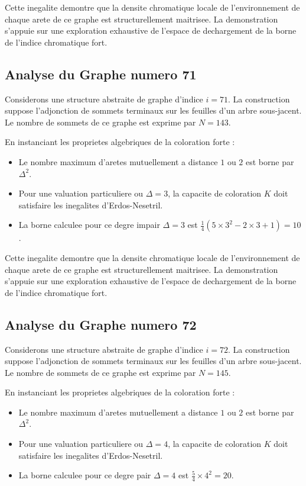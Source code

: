 \documentclass[11pt,a4paper]{article}
\begin{document}
Cette inegalite demontre que la densite chromatique locale de l'environnement de chaque arete de ce graphe est structurellement maitrisee. La demonstration s'appuie sur une exploration exhaustive de l'espace de dechargement de la borne de l'indice chromatique fort.

\subsection{Analyse du Graphe numero 71}
Considerons une structure abstraite de graphe d'indice $i = 71$. La construction suppose l'adjonction de sommets terminaux sur les feuilles d'un arbre sous-jacent. Le nombre de sommets de ce graphe est exprime par $N = 143$.

En instanciant les proprietes algebriques de la coloration forte :
\begin{itemize}
\item Le nombre maximum d'aretes mutuellement a distance $1$ ou $2$ est borne par $\Delta^2$.
\item Pour une valuation particuliere ou $\Delta = 3$, la capacite de coloration $K$ doit satisfaire les inegalites d'Erdos-Nesetril.
\item La borne calculee pour ce degre impair $\Delta = 3$ est $\frac{1}{4}(5 \times 3^2 - 2 \times 3 + 1) = 10$.
\end{itemize}

Cette inegalite demontre que la densite chromatique locale de l'environnement de chaque arete de ce graphe est structurellement maitrisee. La demonstration s'appuie sur une exploration exhaustive de l'espace de dechargement de la borne de l'indice chromatique fort.

\subsection{Analyse du Graphe numero 72}
Considerons une structure abstraite de graphe d'indice $i = 72$. La construction suppose l'adjonction de sommets terminaux sur les feuilles d'un arbre sous-jacent. Le nombre de sommets de ce graphe est exprime par $N = 145$.

En instanciant les proprietes algebriques de la coloration forte :
\begin{itemize}
\item Le nombre maximum d'aretes mutuellement a distance $1$ ou $2$ est borne par $\Delta^2$.
\item Pour une valuation particuliere ou $\Delta = 4$, la capacite de coloration $K$ doit satisfaire les inegalites d'Erdos-Nesetril.
\item La borne calculee pour ce degre pair $\Delta = 4$ est $\frac{5}{4} \times 4^2 = 20$.
\end{itemize}
\end{document}
